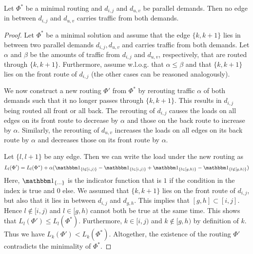 \begin{lemma}
	\label{lemma:parallel-demands}
	Let $\Phi^\ast$ be a minimal routing and $d_{i, j}$ and $d_{u, v}$ be parallel demands.
	Then no edge in between $d_{i, j}$ and $d_{u, v}$ carries traffic from both demands.
\end{lemma}
\begin{proof}
	Let $\Phi^\ast$ be a minimal solution and assume that the edge $\{k, k+1\}$ lies in between two parallel demands $d_{i, j}, d_{u, v}$ and carries traffic from both demands.
	Let $\alpha$ and $\beta$ be the amounts of traffic from $d_{i,j}$ and $d_{u, v}$, respectively, that are routed through $\{k, k+1\}$.
	Furthermore, assume w.l.o.g. that $\alpha \leq \beta$ and that $\{k, k+1\}$ lies on the front route of $d_{i, j}$ (the other cases can be reasoned analogously).
	
	We now construct a new routing $\Phi'$ from $\Phi^\ast$ by rerouting traffic $\alpha$ of both demands such that it no longer passes through $\{k, k+1\}$.
	This results in $d_{i, j}$ being routed all front or all back.
	The rerouting of $d_{i, j}$ causes the loads on all edges on its front route to decrease by $\alpha$ and those on the back route to increase by $\alpha$.
	Similarly, the rerouting of $d_{u, v}$ increases the loads on all edges on its back route by $\alpha$ and decreases those on its front route by $\alpha$.
	
	Let $\{l, l+1\}$ be any edge.
	Then we can write the load under the new routing as
	\begin{equation}
	L_l(\Phi') = L_l(\Phi^\ast) 
	+ \alpha (\dOne_{\{l \notin [i, j)\}} - \dOne_{\{l \in [i, j)\}} +  \dOne_{\{l \in [g, h)\}} - \dOne_{\{l \notin [g, h)\}} )
	\end{equation}
	Here, $\dOne_{\{\ldots\}}$ is the indicator function that is $1$ if the condition in the index is true and $0$ else.
	We assumed that $\{k, k+1\}$ lies on the front route of $d_{i, j}$, but also that it lies in between $d_{i, j}$ and $d_{g, h}$.
	This implies that $[g, h] \subset [i, j]$.
	Hence $l \notin [i, j)$ and $l \in [g, h)$ cannot both be true at the same time.
	This shows that $L_l(\Phi') \leq L_l(\Phi^\ast)$.
	Furthermore, $k \in [i, j)$ and $k \notin [g, h)$ by definition of $k$.
	Thus we have $L_k(\Phi') < L_k(\Phi^\ast)$.
	Altogether, the existence of the routing $\Phi'$ contradicts the minimality of $\Phi^\ast$.
\end{proof}

